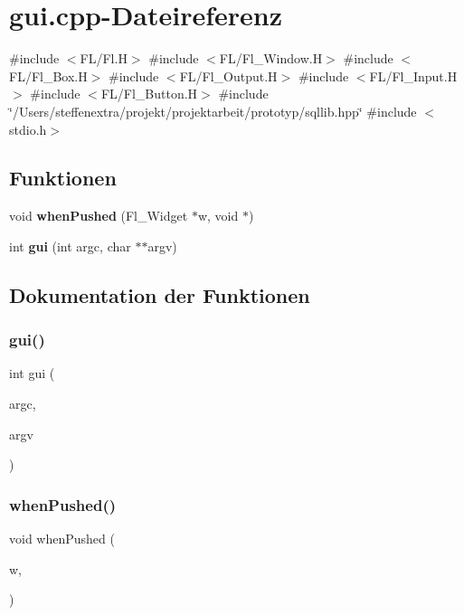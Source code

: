 \section{gui.\+cpp-\/\+Dateireferenz}
\label{gui_8cpp}
{\ttfamily \#include $<$F\+L/\+Fl.\+H$>$}\newline
{\ttfamily \#include $<$F\+L/\+Fl\+\_\+\+Window.\+H$>$}\newline
{\ttfamily \#include $<$F\+L/\+Fl\+\_\+\+Box.\+H$>$}\newline
{\ttfamily \#include $<$F\+L/\+Fl\+\_\+\+Output.\+H$>$}\newline
{\ttfamily \#include $<$F\+L/\+Fl\+\_\+\+Input.\+H$>$}\newline
{\ttfamily \#include $<$F\+L/\+Fl\+\_\+\+Button.\+H$>$}\newline
{\ttfamily \#include \char`\"{}/\+Users/steffenextra/projekt/projektarbeit/prototyp/sqllib.\+hpp\char`\"{}}\newline
{\ttfamily \#include $<$stdio.\+h$>$}\newline
\subsection*{Funktionen}
\begin{DoxyCompactItemize}
\item 
void \textbf{ when\+Pushed} (Fl\+\_\+\+Widget $\ast$w, void $\ast$)
\item 
int \textbf{ gui} (int argc, char $\ast$$\ast$argv)
\end{DoxyCompactItemize}


\subsection{Dokumentation der Funktionen}
\mbox{\label{gui_8cpp_ace0698412b74cdbc0571809a0d903b49}} 
\subsubsection{gui()}
{\footnotesize\ttfamily int gui (\begin{DoxyParamCaption}\item[{int}]{argc,  }\item[{char $\ast$$\ast$}]{argv }\end{DoxyParamCaption})}

\mbox{\label{gui_8cpp_aa0976691d9932853389991b8459ebd85}} 
\subsubsection{when\+Pushed()}
{\footnotesize\ttfamily void when\+Pushed (\begin{DoxyParamCaption}\item[{Fl\+\_\+\+Widget $\ast$}]{w,  }\item[{void $\ast$}]{ }\end{DoxyParamCaption})}

